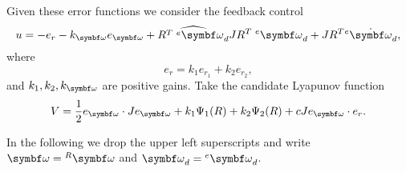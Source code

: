 \begin{tcolorbox}
  Given these error functions we consider the feedback control
  \begin{equation}
    \label{eq:feedback}
    u = -e_r - k_\bomega e_\bomega + \widehat{R^T \; {^e\bomega_d}} J R^T \; {^e\bomega_d} + J R^T {^e\dot \bomega_d},
  \end{equation}
  where
  \begin{equation}
    \label{eq:er}
    e_r = k_1 e_{r_1} + k_2 e_{r_2},
  \end{equation}
  and $k_1, k_2, k_\bomega$ are positive gains. Take the candidate Lyapunov function
  \begin{equation}
    V = \frac{1}{2} e_\bomega \cdot J e_\bomega + k_1 \Psi_1(R) + k_2 \Psi_2(R) + c J e_\bomega \cdot e_r.
  \end{equation}
\end{tcolorbox}

In the following we drop the upper left superscripts and write $\bomega = {^R\bomega}$ and $\bomega_d = {^e\bomega_d}$.


